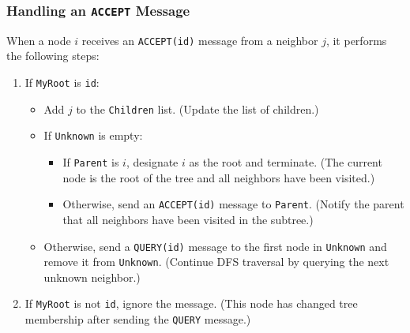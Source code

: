\subsubsection{Handling an \texttt{ACCEPT} Message}
When a node \(i\) receives an \texttt{ACCEPT(id)} message from a neighbor \(j\), it performs the following steps:
\begin{enumerate}
    \item If \texttt{MyRoot} is \texttt{id}:
    \begin{itemize}
        \item Add \(j\) to the \texttt{Children} list. (Update the list of children.)
        \item If \texttt{Unknown} is empty:
        \begin{itemize}
            \item If \texttt{Parent} is \(i\), designate \(i\) as the root and terminate. (The current node is the root of the tree and all neighbors have been visited.)
            \item Otherwise, send an \texttt{ACCEPT(id)} message to \texttt{Parent}. (Notify the parent that all neighbors have been visited in the subtree.)
        \end{itemize}
        \item Otherwise, send a \texttt{QUERY(id)} message to the first node in \texttt{Unknown} and remove it from \texttt{Unknown}. (Continue DFS traversal by querying the next unknown neighbor.)
    \end{itemize}
    \item If \texttt{MyRoot} is not \texttt{id}, ignore the message. (This node has changed tree membership after sending the \texttt{QUERY} message.)
\end{enumerate}


